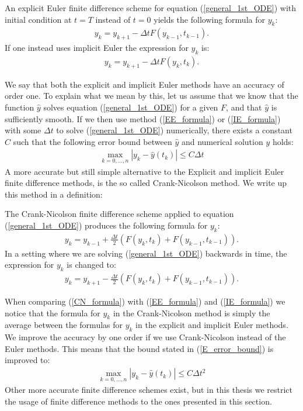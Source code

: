 \begin{definition} \label{Euler_adjoint_def}
An explicit Euler finite difference scheme for equation (\ref{general_1st_ODE}) with initial condition at $t=T$ instead of $t=0$ yields the following formula for $y_k$:
\begin{align}
y_k = y_{k+1} -\Delta tF(y_{k-1},t_{k-1}).\label{EE_adjoint_formula}
\end{align} 
If one instead uses implicit Euler the expression for $y_k$ is:
\begin{align}
y_k = y_{k+1} -\Delta tF(y_{k},t_{k}). \label{IE_adjoint_formula}
\end{align}
\end{definition}
\noindent
We say that both the explicit and implicit Euler methods have an accuracy of order one. To explain what we mean by this, let us assume that we know that the function $\hat y$ solves equation (\ref{general_1st_ODE}) for a given $F$, and that $\hat y$ is sufficiently smooth. If we then use method (\ref{EE_formula}) or (\ref{IE_formula}) with some $\Delta t$ to solve (\ref{general_1st_ODE}) numerically, there exists a constant $C$ such that the  following error bound between $\hat{y}$ and numerical solution $y$ holds:
\begin{align}
\max_{k=0,...,n}|y_k-\hat y(t_k)|\leq C\Delta t \label{E_error_bound}
\end{align}
A more accurate but still simple alternative to the Explicit and implicit Euler finite difference methods, is the so called Crank-Nicolson method\cite{crank1947practical}. We write up this method in a definition:
\begin{definition}
The Crank-Nicolson finite difference scheme applied to equation (\ref{general_1st_ODE}) produces the following formula for $y_k$:
\begin{align}
y_k = y_{k-1} +\frac{\Delta t}{2}(F(y_{k},t_{k})+F(y_{k-1},t_{k-1})). \label{CN_formula}
\end{align}
In a setting where we are solving (\ref{general_1st_ODE}) backwards in time, the expression for $y_k$ is changed to: 
\begin{align}
y_k = y_{k+1} -\frac{\Delta t}{2}(F(y_{k},t_{k})+F(y_{k-1},t_{k-1})). \label{CN_adjoint_formula}
\end{align}
\end{definition}
\noindent
When comparing (\ref{CN_formula}) with (\ref{EE_formula}) and (\ref{IE_formula}) we notice that the formula for $y_k$ in the Crank-Nicolson method is simply the average between the formulas for $y_k$ in the explicit and implicit Euler methods. We improve the accuracy by one order if we use Crank-Nicolson instead of the Euler methods. This means that the bound stated in (\ref{E_error_bound}) is improved to:
\begin{align}
\max_{k=0,...,n}|y_k-\hat y(t_k)|\leq C\Delta t^2 \label{CN_error_bound}
\end{align}
Other more accurate finite difference schemes exist, but in this thesis we restrict the usage of finite difference methods to the ones presented in this section. 
